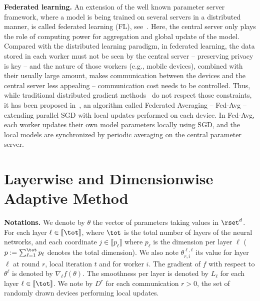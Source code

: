 \documentclass[twoside]{article}
\begin{document}
\vspace{0.1in}
\noindent\textbf{Federated learning.}
An extension of the well known parameter server framework, where a model is being trained on several servers in a distributed manner, is called federated learning (FL), see~\citet{konevcny2016federated}.
Here, the central server only plays the role of computing power for aggregation and global update of the model.
Compared with the distributed learning paradigm, in federated learning, the data stored in each worker must not be seen by the central server -- preserving privacy is key -- and the nature of those workers (e.g., mobile devices), combined with their usually large amount, makes communication between the devices and the central server less appealing -- communication cost needs to be controlled.
Thus, while traditional distributed gradient methods~\citep{recht2011hogwild,li2014scaling,zhao2020distributed} do not respect those constraints, it has been proposed in~\citet{mcmahan2017communication}, an algorithm called Federated Averaging -- Fed-Avg -- extending parallel SGD with local updates performed on each device. 
In Fed-Avg, each worker updates their own model parameters locally using SGD, and the local models are synchronized by periodic averaging on the central parameter server.

\section{Layerwise and Dimensionwise Adaptive Method}\label{sec:main}

\noindent\textbf{Notations.} We denote by $\theta$ the vector of parameters taking values in $\rset^d$. 
For each layer $\ell \in \llbracket \tot \rrbracket$, where $\tot$ is the total number of layers of the neural networks, and each coordinate $j \in \llbracket p_\ell \rrbracket$ where $p_\ell$ is the dimension per layer $\ell$ ($p := \sum_{\ell=1}^\tot p_\ell$ denotes the total dimension).
We also note $\theta_{r,i}^{\ell,t}$ its value for layer $\ell$ at round $r$, local iteration $t$ and for worker $i$.
The gradient of $f$ with respect to $\theta^\ell$ is denoted by $\nabla_{\ell} f(\theta)$.
The smoothness per layer is denoted by $L_\ell$ for each layer $\ell \in \llbracket \tot \rrbracket$.
We note by $D^{r}$ for each communication $r>0$, the set of randomly drawn devices performing local updates.
\end{document}
